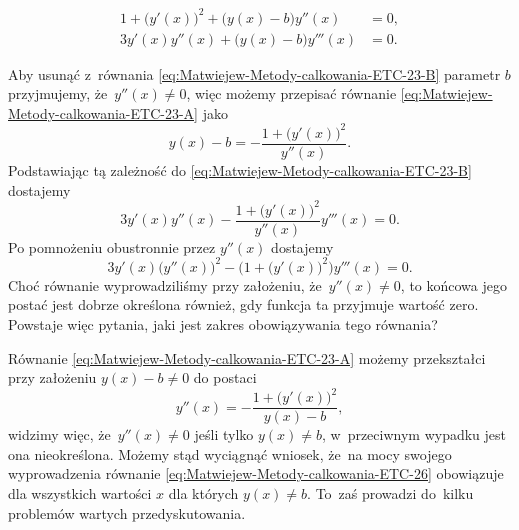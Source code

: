 \documentclass[a4paper,11pt]{article}
\numberwithin{equation}{section}
\begin{document}
\negVerSpaceFour


\begin{subequations}

  \begin{align}
    \label{eq:Uwagi-do-konkrentych-stron-02-A}
    1 + \big( y'( x ) \big)^{ 2 } + \big( y( x ) - b \big) y''( x )
    &= 0, \\
    \label{eq:Uwagi-do-konkrentych-stron-02-B}
    3 y'( x ) y''( x ) + \big( y( x ) - b \big) y'''( x )
    &= 0.
  \end{align}

\end{subequations}


\noindent
Aby usunąć z~równania \eqref{eq:Matwiejew-Metody-calkowania-ETC-23-B}
parametr $b$ przyjmujemy, że~$y''( x ) \neq 0$, więc możemy przepisać równanie
\eqref{eq:Matwiejew-Metody-calkowania-ETC-23-A} jako
\begin{equation}
  \label{eq:Uwagi-do-konkrentych-stron-03}
  y( x ) - b =
  -\frac{ 1 + \big( y'( x ) \big)^{ 2 } }{ y''( x ) }.
\end{equation}
Podstawiając tą zależność do \eqref{eq:Matwiejew-Metody-calkowania-ETC-23-B}
dostajemy
\begin{equation}
  \label{eq:Uwagi-do-konkrentych-stron-04}
  3 y'( x ) y''( x ) -
  \frac{ 1 + \big( y'( x ) \big)^{ 2 } }{ y''( x ) } y'''( x ) = 0.
\end{equation}
Po pomnożeniu obustronnie przez $y''( x )$ dostajemy
\begin{equation}
  \label{eq:Uwagi-do-konkrentych-stron-05}
  3 y'( x ) \big( y''( x ) \big)^{ 2 } -
  \Big( 1 + \big( y'( x ) \big)^{ 2 } \Big) y'''( x ) = 0.
\end{equation}
Choć równanie wyprowadziliśmy przy założeniu, że~$y''( x ) \neq 0$, to końcowa
jego postać jest dobrze określona również, gdy funkcja ta przyjmuje wartość
zero. Powstaje więc pytania, jaki jest zakres obowiązywania tego równania?

Równanie \eqref{eq:Matwiejew-Metody-calkowania-ETC-23-A} możemy przekształci
przy założeniu $y( x ) - b \neq 0$ do postaci
\begin{equation}
  \label{eq:Uwagi-do-konkrentych-stron-06}
  y''( x ) =
  -\frac{ 1 + \big( y'( x ) \big)^{ 2 } }{ y( x ) - b },
\end{equation}
widzimy więc, że~$y''( x ) \neq 0$ jeśli tylko $y( x ) \neq b$, w~przeciwnym
wypadku jest ona nieokreślona. Możemy stąd wyciągnąć wniosek,
że~na mocy swojego wyprowadzenia równanie
\eqref{eq:Matwiejew-Metody-calkowania-ETC-26} obowiązuje dla wszystkich
wartości $x$ dla których $y( x ) \neq b$. To~zaś prowadzi do~kilku problemów
wartych przedyskutowania.
\end{document}
